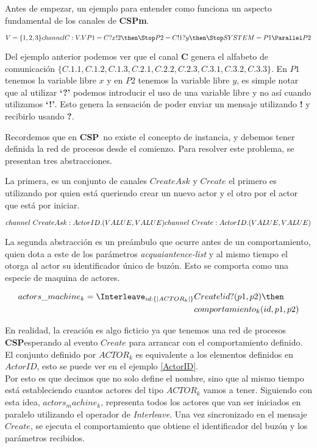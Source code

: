 \documentclass[fleqn]{article}
\newcommand{\CSP}{\textbf{CSP}}
\newcommand{\CSPm}{\textbf{CSPm}}
\begin{document}
Antes de empezar, un ejemplo para entender como funciona un aspecto fundamental
de los canales de \CSPm. 

\[
V = \{1,2,3\} \\
channel C:V.V \\
P1 = C?x!2 \then \Stop \\
P2 = C!1?y \then \Stop \\
SYSTEM = P1 \Parallel P2
\]

Del ejemplo anterior podemos ver que el canal \textbf{C} genera el alfabeto de
comunicación $\{ C.1.1, C.1.2, C.1.3, C.2.1, C.2.2, C.2.3, C.3.1, C.3.2, C.3.3 \}$.
En $P1$ tenemos la variable libre $x$ y en $P2$ tenemos la variable libre $y$,
es simple notar que al utilizar \textbf{`?'} podemos introducir el uso de una
variable libre y no así cuando utilizamos \textbf{`!'}.
Esto genera la sensación de poder enviar un mensaje utilizando \textbf{!} y
recibirlo usando \textbf{?}\cite[chap.~1,p.~27]{Roscoe:1997:TPC:550448}. 

Recordemos que en \CSP\ no existe el concepto de instancia, y debemos
tener definida la red de procesos desde el comienzo. Para resolver este problema, 
se presentan tres abstracciones.

La primera, es un conjunto de canales $CreateAsk$ y $Create$ el primero es utilizando
por quien está queriendo crear un nuevo actor y el otro por el actor que está por 
iniciar.

\[
channel\ CreateAsk:ActorID.(VALUE, VALUE)\\
channel\ Create:ActorID.(VALUE, VALUE)
\]

La segunda abstracción es un preámbulo que ocurre antes de un comportamiento, quien dota a este de 
los parámetros \textit{acquaiantence-list} y al mismo tiempo el otorga al actor su identificador 
único de buzón. Esto se comporta como una especie de maquina de actores.

\begin{align}
actors\_machine_k = \Interleave_{ id : \{| ACTOR_k |\} } & Create!id?(p1, p2) \then \\
&comportamiento_k(id, p1, p2)
\end{align}

En realidad, la creación es algo ficticio ya que tenemos una red de procesos \CSP esperando al 
evento $Create$ para arrancar con el comportamiento definido. \\
El conjunto definido por $ACTOR_k$ es equivalente a los elementos definidos  en $ActorID$, 
esto se puede ver en el ejemplo \ref{ActorID}. \\
Por esto es que decimos que no solo define el nombre, sino que al mismo tiempo está
estableciendo cuantos actores del tipo $ACTOR_k$ vamos a tener.
Siguiendo con esta idea, $actors_machine_k$, representa todos los actores 
que van ser iniciados en paralelo utilizando el operador de \textit{Interleave}.
Una vez sincronizado en el mensaje $Create$, se ejecuta el comportamiento que obtiene
el identificador del buzón y los parámetros recibidos.
\end{document}
